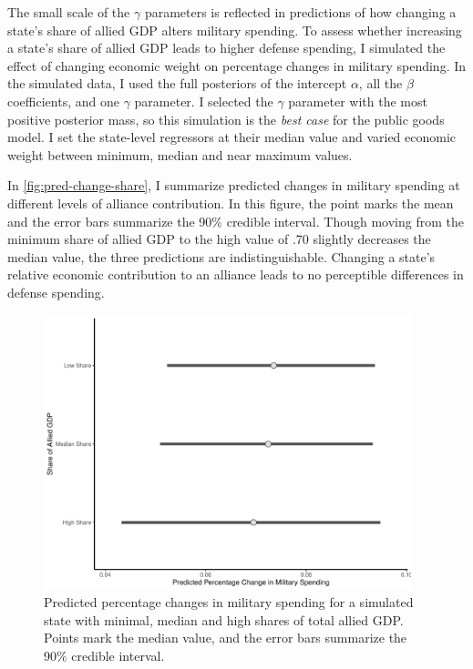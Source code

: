 \documentclass[12pt]{article}
\begin{document}
The small scale of the $\gamma$ parameters is reflected in predictions of how changing a state's share of allied GDP alters military spending. 
To assess whether increasing a state's share of allied GDP leads to higher defense spending, I simulated the effect of changing economic weight on percentage changes in military spending. 
In the simulated data, I used the full posteriors of the intercept $\alpha$, all the $\beta$ coefficients, and one $\gamma$ parameter. 
I selected the $\gamma$ parameter with the most positive posterior mass, so this simulation is the \emph{best case} for the public goods model. 
I set the state-level regressors at their median value and varied economic weight between minimum, median and near maximum values. 


In \autoref{fig:pred-change-share}, I summarize predicted changes in military spending at different levels of alliance contribution. 
In this figure, the point marks the mean and the error bars summarize the 90\% credible interval. 
Though moving from the minimum share of allied GDP to the high value of .70 slightly decreases the median value, the three predictions are indistinguishable. 
Changing a state's relative economic contribution to an alliance leads to no perceptible differences in defense spending. 

\begin{figure}[htbp]
	\centering
		\includegraphics[width=0.95\textwidth]{pred-change-share.pdf}
	\caption{Predicted percentage changes in military spending for a simulated state with minimal, median and high shares of total allied GDP. Points mark the median value, and the error bars summarize the 90\% credible interval.}
	\label{fig:pred-change-share}
\end{figure}
\end{document}
